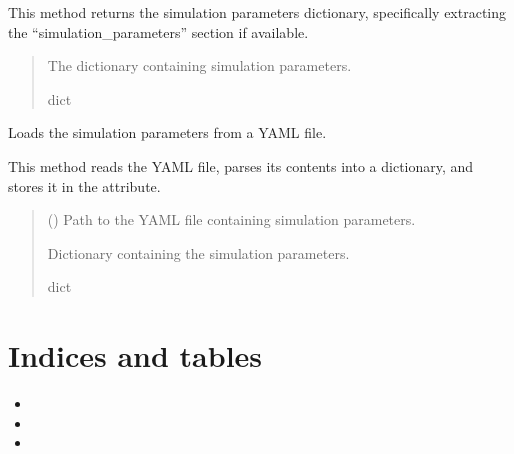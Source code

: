 \documentclass[letterpaper,10pt,english]{sphinxmanual}
\begin{document}
\begin{fulllineitems}
\begin{fulllineitems}
\sphinxAtStartPar
This method returns the simulation parameters dictionary,
specifically extracting the “simulation\_parameters” section if available.
\begin{quote}\begin{description}
\sphinxAtStartPar
The dictionary containing simulation parameters.

\sphinxAtStartPar
dict

\end{description}\end{quote}

\end{fulllineitems}


\begin{fulllineitems}
\label{\detokenize{src:src.Input_Parser.InputParser.load_simulation_parameters}}
\pysigstartsignatures
{}
\pysigstopsignatures
\sphinxAtStartPar
Loads the simulation parameters from a YAML file.

\sphinxAtStartPar
This method reads the YAML file, parses its contents into a dictionary,
and stores it in the  attribute.
\begin{quote}\begin{description}
\sphinxAtStartPar
{} () \textendash{} Path to the YAML file containing simulation parameters.

\sphinxAtStartPar
Dictionary containing the simulation parameters.

\sphinxAtStartPar
dict

\end{description}\end{quote}

\end{fulllineitems}


\end{fulllineitems}



\chapter{Indices and tables}
\label{\detokenize{index:indices-and-tables}}\begin{itemize}
\item {} 
\sphinxAtStartPar
{}

\item {} 
\sphinxAtStartPar
{}

\item {} 
\sphinxAtStartPar
{}

\end{itemize}
\end{document}
